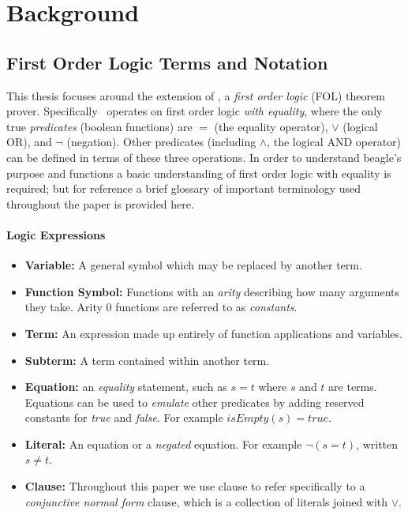 
\chapter{Background}
\label{cha:background}

\section{First Order Logic Terms and Notation}
\label{sec:terminology}

This thesis focuses around the extension of \beagle, a \emph{first order logic} (FOL) theorem prover.
Specifically \beagle\ operates on first order logic \emph{with equality}, where the only
true \emph{predicates} (boolean functions) are $=$ (the equality operator), $\lor$ (logical OR),  and
$\lnot$ (negation). Other predicates (including $\land$, the logical AND operator) can be defined
in terms of these three operations.
In order to understand beagle's purpose and functions a basic understanding of first order logic
with equality is required; but for reference a brief glossary of important terminology used throughout the paper
is provided here.

\subsubsection{Logic Expressions}

\begin{itemize}
\item \textbf{Variable:} A general symbol which may be replaced by another term.
\item \textbf{Function Symbol:} Functions with an \emph{arity} describing how many
arguments they take. Arity 0 functions are referred to as \emph{constants}.
\item \textbf{Term:} An expression made up entirely of function applications and variables.
\item \textbf{Subterm:} A term contained within another term.
\item \textbf{Equation:} an \emph{equality} statement, such as $s = t$ where $s$
and $t$ are terms. Equations can be used to \emph{emulate} other predicates
by adding reserved constants for \emph{true} and \emph{false}. For example $isEmpty(s) = true$.
\item \textbf{Literal:} An equation or a \emph{negated} equation. For example $\lnot (s = t)$,
written $s \neq t$.
\item \textbf{Clause:} Throughout this paper we use clause to refer specifically to a \emph{conjunctive normal form} clause,
which is a collection of literals joined with $\lor$.
\end{itemize}

